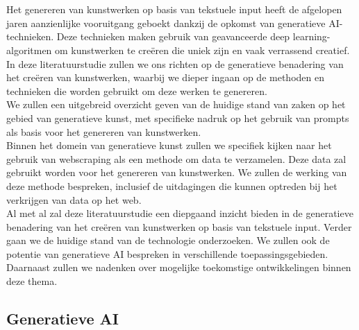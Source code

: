 \chapter{}%
\label{ch:stand-van-zaken}



Het genereren van kunstwerken op basis van tekstuele input heeft de afgelopen jaren aanzienlijke vooruitgang geboekt dankzij de opkomst van generatieve AI-technieken. Deze technieken maken gebruik van geavanceerde deep learning-algoritmen om kunstwerken te creëren die uniek zijn en vaak verrassend creatief. In deze literatuurstudie zullen we ons richten op de generatieve benadering van het creëren van kunstwerken, waarbij we dieper ingaan op de methoden en technieken die worden gebruikt om deze werken te genereren. \\

We zullen een uitgebreid overzicht geven van de huidige stand van zaken op het gebied van generatieve kunst, met specifieke nadruk op het gebruik van prompts als basis voor het genereren van kunstwerken. \\

Binnen het domein van generatieve kunst zullen we specifiek kijken naar het gebruik van webscraping als een methode om data te verzamelen. Deze data zal gebruikt worden voor het genereren van kunstwerken. We zullen de werking van deze methode bespreken, inclusief de uitdagingen die kunnen optreden bij het verkrijgen van data op het web. \\

Al met al zal deze literatuurstudie een diepgaand inzicht bieden in de generatieve benadering van het creëren van kunstwerken op basis van tekstuele input. Verder gaan we de huidige stand van de technologie onderzoeken. We zullen ook de potentie van generatieve AI bespreken in verschillende toepassingsgebieden. Daarnaast zullen we nadenken over mogelijke toekomstige ontwikkelingen binnen deze thema. 
\pagebreak


\section{Generatieve AI}

